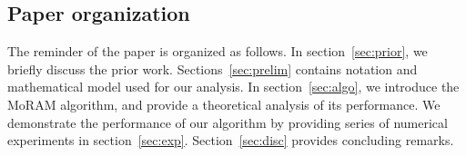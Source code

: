 \subsection{Paper organization} 
The reminder of the paper is organized as follows. In section~\ref{sec:prior}, we briefly discuss the prior work. Sections~\ref{sec:prelim} contains notation and mathematical model used for our analysis. In section~\ref{sec:algo}, we introduce the MoRAM algorithm, and provide a theoretical analysis of its performance. We demonstrate the performance of our algorithm by providing series of numerical experiments in section~\ref{sec:exp}. Section~\ref{sec:disc} provides concluding remarks.